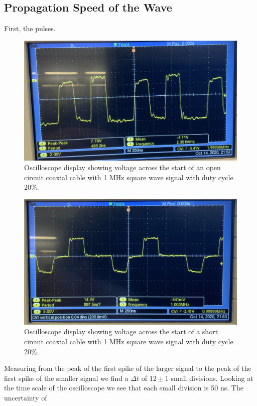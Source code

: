 \documentclass[12pt]{article}
\numberwithin{equation}{section}
\numberwithin{figure}{section}
\begin{document}
    \subsection{Propagation Speed of the Wave}\label{sec:PropagationSpeedResults}
    First, the pulses.
    \begin{figure}[H]
        \begin{center}
            \includegraphics[width=.65\textwidth]{Open_Zoom.jpg}
            \caption{Oscilloscope display showing voltage across the start of an open circuit 
            coaxial cable with 1 MHz square wave signal with duty cycle 20\%.}
            \label{fig:OpenCircuitPulse}
        \end{center}
    \end{figure}
    \begin{figure}[H]
        \begin{center}
            \includegraphics[width=.65\textwidth]{Short_Zoom.jpg}
            \caption{Oscilloscope display showing voltage across the start of a short circuit 
            coaxial cable with 1 MHz square wave signal with duty cycle 20\%.}
            \label{fig:ShortCircuitPulse}
        \end{center}
    \end{figure}
    Measuring from the peak of the first spike of the larger signal to the peak of the first 
    spike of the smaller signal we find a $\Delta t$ of $12\pm1$ small divisions. Looking at the 
    time scale of the oscilloscope we see that each small division is 50 ns. The uncertainty of 
\end{document}
